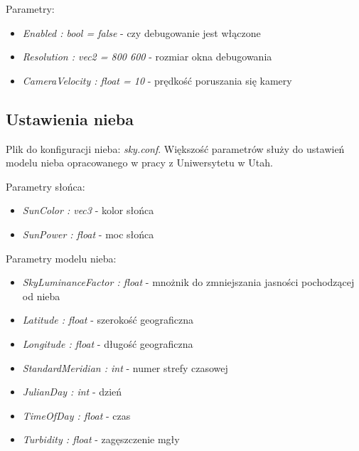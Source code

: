 \documentclass[inz,longabstract]{iithesis}
\begin{document}
        Parametry:
        \begin{itemize}
            \item \textit{Enabled : bool = false} - czy debugowanie jest włączone
            \item \textit{Resolution : vec2 = 800 600} - rozmiar okna debugowania
            \item \textit{CameraVelocity : float = 10} - prędkość poruszania się kamery 
        \end{itemize}
        
        \subsection{Ustawienia nieba}
        Plik do konfiguracji nieba: \textit{sky.conf}. Większość parametrów służy do ustawień modelu nieba opracowanego w pracy z Uniwersytetu w Utah\cite{sky}.
        
        Parametry słońca:
        \begin{itemize}
            \item \textit{SunColor : vec3} - kolor słońca 
            \item \textit{SunPower : float} - moc słońca
        \end{itemize}
        
        Parametry modelu nieba:
        \begin{itemize}
            \item \textit{SkyLuminanceFactor : float} - mnożnik do zmniejszania jasności pochodzącej od nieba
            \item \textit{Latitude : float} - szerokość geograficzna
            \item \textit{Longitude : float} - długość geograficzna
            \item \textit{StandardMeridian : int} - numer strefy czasowej
            \item \textit{JulianDay : int} - dzień
            \item \textit{TimeOfDay : float} - czas
            \item \textit{Turbidity : float} - zagęszczenie mgły 
        \end{itemize}
        
\end{document}
